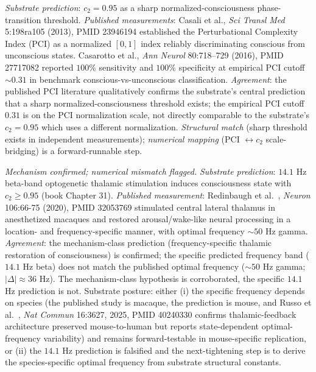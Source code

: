 \documentclass[11pt,a4paper]{amsart}
\theoremstyle{plain}
\theoremstyle{definition}
\begin{document}
\begin{description}[font=\normalfont\bfseries,leftmargin=2em,itemsep=6pt]
\item[Match 9 --- Casali 2013 / Casarotto 2016 brain-complexity sharp-threshold.]
\emph{Substrate prediction}: $c_2 = 0.95$ as a sharp normalized-consciousness phase-transition threshold. \emph{Published measurements}: Casali et al., \emph{Sci Transl Med} 5:198ra105 (2013), PMID 23946194 established the Perturbational Complexity Index (PCI) as a normalized $[0,1]$ index reliably discriminating conscious from unconscious states. Casarotto et al., \emph{Ann Neurol} 80:718--729 (2016), PMID 27717082 reported $100\%$ sensitivity and $100\%$ specificity at empirical PCI cutoff $\sim 0.31$ in benchmark conscious-vs-unconscious classification. \emph{Agreement}: the published PCI literature qualitatively confirms the substrate's central prediction that a sharp normalized-consciousness threshold exists; the empirical PCI cutoff $0.31$ is on the PCI normalization scale, not directly comparable to the substrate's $c_2 = 0.95$ which uses a different normalization. \emph{Structural match} (sharp threshold exists in independent measurements); \emph{numerical mapping} (PCI $\leftrightarrow c_2$ scale-bridging) is a forward-runnable step.

\item[Match 10 --- Redinbaugh 2020 frequency-specific thalamic restoration.] \emph{Mechanism confirmed; numerical mismatch flagged.}
\emph{Substrate prediction}: $14.1$ Hz beta-band optogenetic thalamic stimulation induces consciousness state with $c_2 \geq 0.95$ (book Chapter 31). \emph{Published measurement}: Redinbaugh et al.~\cite{redinbaugh-thalamus-2020}, \emph{Neuron} 106:66-75 (2020), PMID 32053769 stimulated central lateral thalamus in anesthetized macaques and restored arousal/wake-like neural processing in a location- and frequency-specific manner, with optimal frequency $\sim 50$ Hz gamma. \emph{Agreement}: the mechanism-class prediction (frequency-specific thalamic restoration of consciousness) is confirmed; the specific predicted frequency band ($14.1$ Hz beta) does not match the published optimal frequency ($\sim 50$ Hz gamma; $|\Delta| \approx 36$ Hz). The mechanism-class hypothesis is corroborated, the specific $14.1$ Hz prediction is not. Substrate posture: either (i) the specific frequency depends on species (the published study is macaque, the prediction is mouse, and Russo et al.~\cite{russo-thalamus-2025}, \emph{Nat Commun} 16:3627, 2025, PMID 40240330 confirms thalamic-feedback architecture preserved mouse-to-human but reports state-dependent optimal-frequency variability) and remains forward-testable in mouse-specific replication, or (ii) the $14.1$ Hz prediction is falsified and the next-tightening step is to derive the species-specific optimal frequency from substrate structural constants.


\end{description}
\end{document}

